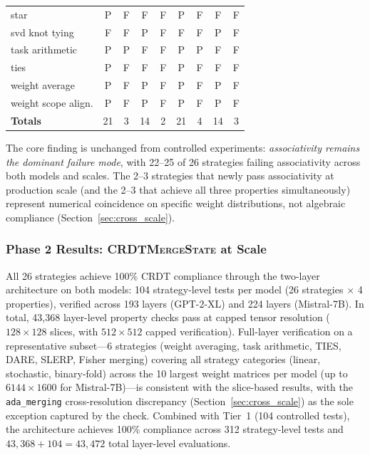 \documentclass[10pt,letterpaper]{article}
\newcommand{\CMS}{\texorpdfstring{{\mdseries\upshape\textsc{CRDTMergeState}}}{CRDTMergeState}}
\begin{document}
\begin{table}[t]
\begin{tabular}{l ccc c ccc c}
star                & P & F & F & F & P & F & F & F \\
svd knot tying      & F & F & P & F & F & F & P & F \\
task arithmetic     & P & P & F & F & P & P & F & F \\
ties                & P & F & F & F & P & F & F & F \\
weight average      & P & F & P & F & P & F & P & F \\
weight scope align. & P & F & P & F & P & F & P & F \\
\midrule
\textbf{Totals}     & 21 & 3 & 14 & 2 & 21 & 4 & 14 & 3 \\
\bottomrule
\end{tabular}
\end{table}

The core finding is unchanged from controlled experiments: \emph{associativity remains the dominant failure mode}, with 22--25 of 26 strategies failing associativity across both models and scales.
The 2--3 strategies that newly pass associativity at production scale (and the 2--3 that achieve all three properties simultaneously) represent numerical coincidence on specific weight distributions, not algebraic compliance (Section~\ref{sec:cross_scale}).

\subsubsection{Phase 2 Results: \CMS{} at Scale}\label{sec:prod_phase2}

All 26 strategies achieve 100\% CRDT compliance through the two-layer architecture on both models: 104 strategy-level tests per model (26 strategies $\times$ 4 properties), verified across 193 layers (GPT-2-XL) and 224 layers (Mistral-7B).
In total, 43{,}368 layer-level property checks pass at capped tensor resolution ($128\times 128$ slices, with $512\times 512$ capped verification).
Full-layer verification on a representative subset---6 strategies (weight averaging, task arithmetic, TIES, DARE, SLERP, Fisher merging) covering all strategy categories (linear, stochastic, binary-fold) across the 10 largest weight matrices per model (up to $6144\times 1600$ for Mistral-7B)---is consistent with the slice-based results, with the \texttt{ada\_merging} cross-resolution discrepancy (Section~\ref{sec:cross_scale}) as the sole exception captured by the check.
Combined with Tier~1 (104 controlled tests), the architecture achieves 100\% compliance across 312 strategy-level tests and $43{,}368 + 104 = 43{,}472$ total layer-level evaluations.
\end{document}
